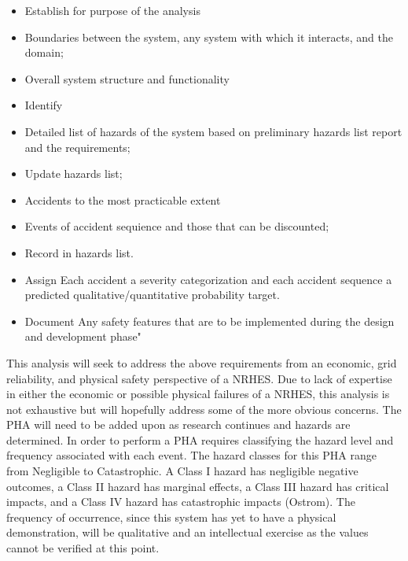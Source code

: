 \documentclass[12pt]{UIdahoMastersThesis}
\begin{document}
\begin{itemize}
\item Establish for purpose of the analysis
\item Boundaries between the system, any system with which it interacts, and the domain;
\item Overall system structure and functionality
\item Identify
\item Detailed list of hazards of the system based on preliminary hazards list report and the requirements;
\item Update hazards list;
\item Accidents to the most practicable extent
\item Events of accident sequience and those that can be discounted;
\item Record in hazards list.
\item Assign Each accident a severity categorization and each accident sequence a predicted qualitative/quantitative probability target.
\item Document Any safety features that are to be implemented during the design and development phase"
\end{itemize}
This analysis will seek to address the above requirements from an economic, grid reliability, and physical safety perspective of a NRHES. Due to lack of expertise in either the economic or possible physical failures of a NRHES, this analysis is not exhaustive but will hopefully address some of the more obvious concerns. The PHA will need to be added upon as research continues and hazards are determined.
	In order to perform a PHA requires classifying the hazard level and frequency associated with each event. The hazard classes for this PHA range from Negligible to Catastrophic. A Class I hazard has negligible negative outcomes, a Class II hazard has marginal effects, a Class III hazard has critical impacts, and a Class IV hazard has catastrophic impacts (Ostrom).  The frequency of occurrence, since this system has yet to have a physical demonstration, will be qualitative and an intellectual exercise as the values cannot be verified at this point.
\end{document}
